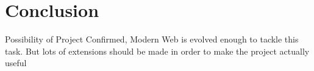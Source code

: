 \chapter{Conclusion}
Possibility of Project Confirmed, Modern Web is evolved enough to tackle this task. But lots of extensions should be made in order to make the project actually useful
